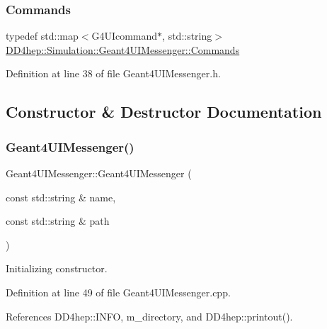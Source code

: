 \subsubsection{\texorpdfstring{Commands}{Commands}}
{\footnotesize\ttfamily typedef std\+::map$<$G4\+U\+Icommand$\ast$, std\+::string$>$ \hyperlink{class_d_d4hep_1_1_simulation_1_1_geant4_u_i_messenger_a07e66059e5542ef6c393fda188f44907}{D\+D4hep\+::\+Simulation\+::\+Geant4\+U\+I\+Messenger\+::\+Commands}}



Definition at line 38 of file Geant4\+U\+I\+Messenger.\+h.



\subsection{Constructor \& Destructor Documentation}
\hypertarget{class_d_d4hep_1_1_simulation_1_1_geant4_u_i_messenger_a869808e8fd7f7611767389c6eb655fbd}{}\label{class_d_d4hep_1_1_simulation_1_1_geant4_u_i_messenger_a869808e8fd7f7611767389c6eb655fbd} 
\subsubsection{\texorpdfstring{Geant4\+U\+I\+Messenger()}{Geant4UIMessenger()}}
{\footnotesize\ttfamily Geant4\+U\+I\+Messenger\+::\+Geant4\+U\+I\+Messenger (\begin{DoxyParamCaption}\item[{const std\+::string \&}]{name,  }\item[{const std\+::string \&}]{path }\end{DoxyParamCaption})}



Initializing constructor. 



Definition at line 49 of file Geant4\+U\+I\+Messenger.\+cpp.



References D\+D4hep\+::\+I\+N\+FO, m\+\_\+directory, and D\+D4hep\+::printout().

\hypertarget{class_d_d4hep_1_1_simulation_1_1_geant4_u_i_messenger_aad6ad70233b8f95d1cdd09661ad0d510}{}\label{class_d_d4hep_1_1_simulation_1_1_geant4_u_i_messenger_aad6ad70233b8f95d1cdd09661ad0d510} 
